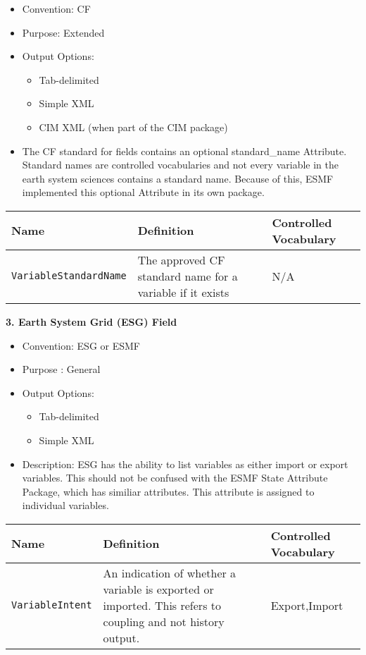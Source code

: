 \begin{itemize}
    \item Convention: CF
    \item Purpose: Extended
    \item Output Options: 
    \begin{itemize}
        \item Tab-delimited
        \item Simple XML
        \item CIM XML (when part of the CIM package)
    \end{itemize} 
    \item The CF standard for fields contains an optional standard\_name Attribute. Standard names are controlled vocabularies and not every variable in the earth system sciences contains a standard name. Because of this, ESMF implemented this optional Attribute in its own package.
\end{itemize}

\begin{tabular}{|p{8cm}|p{20cm}|p{10cm}|}
    {\bf Name } & {\bf Definition} & {\bf Controlled Vocabulary} \\
    \hline\hline
    {\tt VariableStandardName} & The approved CF standard name for a variable if it exists &  N/A\\
\end{tabular}



\vspace{.20in}
{\bf 3. Earth System Grid (ESG) Field}

\begin{itemize}
    \item Convention: ESG or ESMF
    \item Purpose : General
    \item Output Options: 
    \begin{itemize}
        \item Tab-delimited
        \item Simple XML
    \end{itemize}
    \item Description: ESG has the ability to list variables as either import or export variables. This should not be confused with the ESMF State Attribute Package, which has similiar attributes. This attribute is assigned to individual variables.  
\end{itemize}

\begin{tabular}{|p{8cm}|p{20cm}|p{10cm}|}
     {\bf Name } & {\bf Definition} & {\bf Controlled Vocabulary} \\
     \hline\hline
     {\tt VariableIntent} & An indication of whether a variable is exported or imported. This refers to coupling and not history output. & Export,Import\\
\end{tabular}




